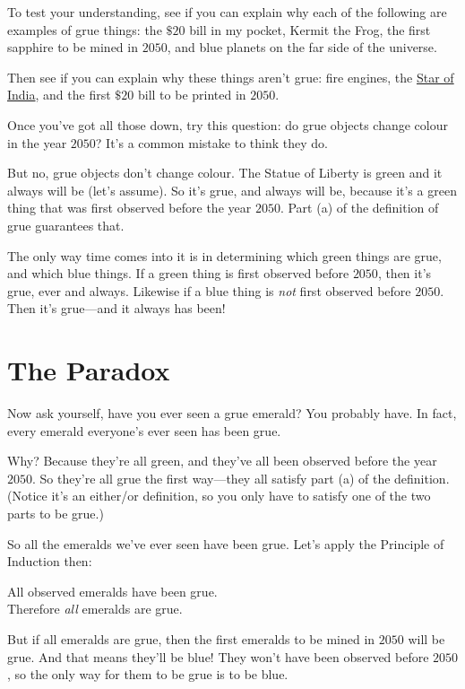 \documentclass[justified]{tufte-book}
\theoremstyle{definition}
\theoremstyle{definition}
\theoremstyle{definition}
\theoremstyle{definition}
\theoremstyle{remark}
\begin{document}
To test your understanding, see if you can explain why each of the following are examples of grue things: the \(\$20\) bill in my pocket, Kermit the Frog, the first sapphire to be mined in \(2050\), and blue planets on the far side of the universe.

Then see if you can explain why these things aren't grue: fire engines, the \href{https://en.wikipedia.org/wiki/Star_of_India_(gem)}{Star of India}, and the first \(\$20\) bill to be printed in \(2050\).

Once you've got all those down, try this question: do grue objects change colour in the year \(2050\)? It's a common mistake to think they do.

But no, grue objects don't change colour. The Statue of Liberty is green and it always will be (let's assume). So it's grue, and always will be, because it's a green thing that was first observed before the year \(2050\). Part (a) of the definition of grue guarantees that.

The only way time comes into it is in determining which green things are grue, and which blue things. If a green thing is first observed before \(2050\), then it's grue, ever and always. Likewise if a blue thing is \emph{not} first observed before \(2050\). Then it's grue---and it always has been!

\hypertarget{the-paradox}{%
\section*{The Paradox}\label{the-paradox}}

Now ask yourself, have you ever seen a grue emerald? You probably have. In fact, every emerald everyone's ever seen has been grue.

Why? Because they're all green, and they've all been observed before the year \(2050\). So they're all grue the first way---they all satisfy part (a) of the definition. (Notice it's an either/or definition, so you only have to satisfy one of the two parts to be grue.)

So all the emeralds we've ever seen have been grue. Let's apply the Principle of Induction then:

\begin{argument}
All observed emeralds have been grue.\\
Therefore \emph{all} emeralds are grue.
\end{argument}

But if all emeralds are grue, then the first emeralds to be mined in \(2050\) will be grue. And that means they'll be blue! They won't have been observed before \(2050\), so the only way for them to be grue is to be blue.
\end{document}
